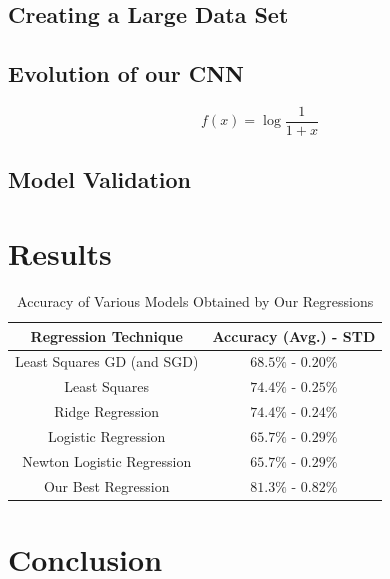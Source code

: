 \documentclass[10pt,conference,compsocconf]{IEEEtran}
\begin{document}
\subsection{Creating a Large Data Set} 
\label{ssec:data_proc}


\subsection{Evolution of our CNN} 
\label{ssec:technique}

\begin{equation} 
	\label{eq1}
	f(x) = \log{\frac{1}{1+x}}
\end{equation}


\subsection{Model Validation} 
\label{ssec:model_validation}


\section{Results}
\label{sec:results}

\begin{table}[h]
	\begin{tabular}{ |c|c| } 
		\hline
		\textbf{Regression Technique} & \textbf{Accuracy (Avg.) - STD}  \\
		\hline
		Least Squares GD (and SGD) & $68.5\%$ - $0.20\%$ \\ 
		Least Squares & $74.4\%$ - $0.25\%$ \\ 
		Ridge Regression & $74.4\%$ - $0.24\%$ \\ 
		Logistic Regression & $65.7\%$ - $0.29\%$ \\ 
		Newton Logistic Regression & $65.7\%$ - $0.29\%$ \\ 
		Our Best Regression & $81.3\%$ - $0.82\%$ \\ 
		\hline
	\end{tabular}
	\captionsetup{aboveskip=0.3cm,justification=centering, margin=0.1cm, labelfont=footnotesize, textfont=footnotesize}
	\caption{Accuracy of Various Models Obtained by Our Regressions}
	\label{tab:model_accuracy}
\end{table}

\section{Conclusion}
\label{sec:conclusion}
\end{document}
